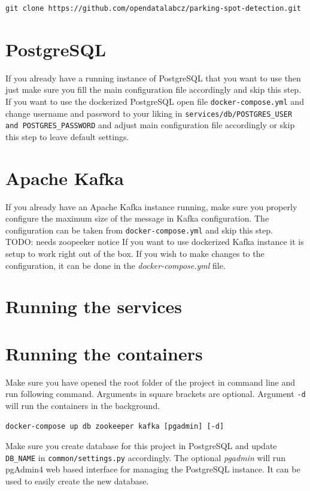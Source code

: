\documentclass[thesis=M,english]{FITthesis}[2019/03/06]
\begin{document}
\begin{verbatim}
git clone https://github.com/opendatalabcz/parking-spot-detection.git
\end{verbatim}


\section{PostgreSQL}
If you already have a running instance of PostgreSQL that you want to use then just make sure you fill the main configuration file accordingly and skip this step.\\

If you want to use the dockerized PostgreSQL open file \texttt{docker-compose.yml} and change username and password to your liking in \texttt{services/db/POSTGRES_USER and POSTGRES_PASSWORD} and adjust main configuration file accordingly or skip this step to leave default settings.\\

\section{Apache Kafka}
If you already have an Apache Kafka instance running, make sure you properly configure the maximum size of the message in Kafka configuration. The configuration can be taken from \texttt{docker-compose.yml} and skip this step.\\
TODO: needs zoopeeker notice
If you want to use dockerized Kafka instance it is setup to work right out of the box. If you wish to make changes to the configuration, it can be done in the \textit{docker-compose.yml} file.

\section{Running the services}
\section{Running the containers}
Make sure you have opened the root folder of the project in command line and run following command. Arguments in square brackets are optional. Argument \texttt{-d} will run the containers in the background.

\begin{verbatim}
docker-compose up db zookeeper kafka [pgadmin] [-d]
\end{verbatim}

Make sure you create database for this project in PostgreSQL and update \texttt{DB_NAME} in \texttt{common/settings.py} accordingly. The optional \textit{pgadmin} will run pgAdmin4 web based interface for managing the PostgreSQL instance. It can be used to easily create the new database.\\
\end{document}
